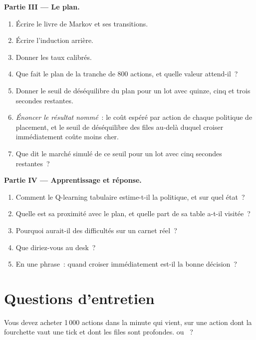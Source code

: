 \begin{problem}
\medskip\noindent\textbf{Partie III --- Le plan.}
\begin{enumerate}[resume]
\item Écrire le livre de Markov et ses transitions.
\item Écrire l'induction arrière.
\item Donner les taux calibrés.
\item Que fait le plan de la tranche de 800 actions, et quelle valeur attend-il~?
\item Donner le seuil de déséquilibre du plan pour un lot avec quinze, cinq et trois secondes restantes.
\item \emph{Énoncer le résultat nommé}~: le coût espéré par action de chaque politique de placement, et le seuil de déséquilibre des files au-delà duquel croiser
immédiatement coûte moins cher.
\item Que dit le marché simulé de ce seuil pour un lot avec cinq secondes restantes~?
\end{enumerate}

\medskip\noindent\textbf{Partie IV --- Apprentissage et réponse.}
\begin{enumerate}[resume]
\item Comment le Q-learning tabulaire estime-t-il la politique, et sur quel état~?
\item Quelle est sa proximité avec le plan, et quelle part de sa table a-t-il visitée~?
\item Pourquoi aurait-il des difficultés sur un carnet réel~?
\item Que diriez-vous au desk~?
\item En une phrase~: quand croiser immédiatement est-il la bonne décision~?
\end{enumerate}
\end{problem}

\section{Questions d'entretien}

\begin{interviewq}\label{iq:mx:child-order-placement:1}
Vous devez acheter 1\,000 actions dans la minute qui vient, sur une action dont la fourchette vaut une tick et dont les files sont profondes.  ou ~?
\end{interviewq}

